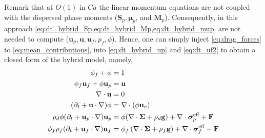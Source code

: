 Remark that at $O(1)$ in $Ca$ the linear momentum equations are not coupled with the dispersed phase moments ($\textbf{S}_p,\bm\mu_p$, and $\textbf{M}_p$).  
Consequently, in this approach \ref{eq:dt_hybrid_Sp,eq:dt_hybrid_Mp,eq:dt_hybrid_mup} are not needed to compute ($\textbf{u}_p,\textbf{u},\textbf{u}_f,p_f,\phi$).
Hence, one can simply inject \ref{eq:drag_forces} to \ref{eq:mean_contributions}, into  \ref{eq:dt_hybrid_up} and \ref{eq:dt_uf2} to obtain a closed form of the hybrid model, namely,  
\begin{align}
    \label{eq:firstSys}
    \phi_f + \phi &= 1\\
    \phi_f\textbf{u}_f + 
    \phi\textbf{u}_p&=\textbf{u}\\
    \div \textbf{u} &= 0\\
    (\pddt + \textbf{u} \cdot \grad)\phi
    &=
    \div (\phi \textbf{u}_r)\\
    \rho_d \phi (\pddt + \textbf{u}_p \cdot \grad)\textbf{u}_p
    &=
    \phi(\div \bm\Sigma
    + \rho_d  \textbf{g})
    + \div \bm\sigma_p^\text{eff}
    + \textbf{F}
    \\
    \phi_f \rho_f(\pddt + \textbf{u}_f  \cdot \grad) \textbf{u}_f
    &= \phi_f 
    \left(\div \bm\Sigma
    + \rho_f \textbf{g}\right)
    + \div \bm\sigma_f^\text{eff}
    -\textbf{F}
    \label{eq:lastSys}
\end{align}
